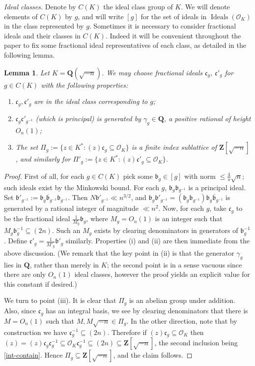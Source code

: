 \documentclass[11pt,reqno]{amsart}
\numberwithin{equation}{section}
\newtheorem{lemma}[theorem]{Lemma}
\theoremstyle{definition}
\theoremstyle{remark}
\newcommand{\mf}{\mathfrak}
\renewcommand{\le}{\leqslant}
\newcommand\Z{\mathbf{Z}}
\newcommand\Q{\mathbf{Q}}
\newcommand\Ideals{\operatorname{Ideals}}
\renewcommand\O{\mathcal{O}}
\begin{document}
\emph{Ideal classes.} Denote by $C(K)$ the ideal class group of $K$. We will denote elements of $C(K)$ by $g$, and will write $[g]$ for the set of ideals in $\Ideals(\O_K)$ in the class represented by $g$. Sometimes it is necessary to consider fractional ideals and their classes in $C(K)$. Indeed it will be convenient throughout the paper to fix some fractional ideal representatives of each class, as detailed in the following lemma. 
\begin{lemma}\label{lem:ideal-reps}
Let $K = \Q(\sqrt{-n})$. We may choose fractional ideals $\mf{c}_g$, $\mf{c}'_g$ for $g \in C(K)$ with the following properties:
\begin{enumerate}
\item[\textup{(i)}]$\mf{c}_g, \mf{c}'_g$ are in the ideal class corresponding to $g$;
\item[\textup{(ii)}]$\mf{c}_g \mf{c}'_{g^{-1}}$ \textup{(}which is principal\textup{)} is generated by $\gamma_g \in \Q$, a positive rational of height $O_n(1)$;
\item[\textup{(iii)}] The set $\Pi_g := \{ z \in K^* : (z) \mf{c}_g \subseteq\O_K\}$ is a finite index sublattice of $\Z[\sqrt{-n}]$, and similarly for $\Pi'_g := \{ z \in K^* : (z) \mf{c}'_g \subseteq\O_K\}$.
\end{enumerate}
\end{lemma}
\begin{proof}
First of all, for each $g \in C(K)$ pick some $\mf{b}_g \in [g]$ with norm $\le \frac{4}{\pi}\sqrt{n}$; such ideals exist by the Minkowski bound. For each $g$, $\mf{b}_g \mf{b}_{g^{-1}}$ is a principal ideal. Set $\mf{b}'_{g^{-1}} := \overline{\mf{b}_g \mf{b}_{g^{-1}}} \mf{b}_{g^{-1}}$. Then $N\mf{b}'_{g^{-1}} \ll n^{3/2}$, and $\mf{b}_g \mf{b}'_{g^{-1}} = (\mf{b}_g \mf{b}_{g^{-1}})\overline{\mf{b}_g \mf{b}_{g^{-1}}}$ is generated by a rational integer of magnitude $\ll n^2$. Now, for each $g$, take $\mf{c}_g$ to be the fractional ideal $\frac{1}{M_g} \mf{b}_g$, where $M_g = O_n(1)$ is an integer such that $M_g\mf{b}_g^{-1} \subseteq (2n)$. Such an $M_g$ exists by clearing denominators in generators of $\mf{b}^{-1}_g$. Define $\mf{c}'_g = \frac{1}{M'_g}\mf{b}'_g$ similarly. Properties (i) and (ii) are then immediate from the above discussion. (We remark that the key point in (ii) is that the generator $\gamma_g$ lies in $\Q$, rather than merely in $K$; the second point is in a sense vacuous since there are only $O_n(1)$ ideal classes, however the proof yields an explicit value for this constant if desired.)

We turn to point (iii). It is clear that $\Pi_g$ is an abelian group under addition. Also, since $\mf{c}_g$ has an integral basis, we see by clearing denominators that there is $M = O_n(1)$ such that $M, M\sqrt{-n} \in \Pi_g$.
In the other direction, note that by construction we have $\mf{c}_g^{-1} \subseteq (2n)$. Therefore if $(z) \mf{c}_g \subseteq \O_K$ then $(z) = (z) \mf{c}_g \mf{c}_g^{-1} \subseteq \O_K \mf{c}_g^{-1} \subseteq (2n) \subseteq \Z[\sqrt{-n}]$, the second inclusion being \cref{int-contain}. Hence $\Pi_g \subseteq \Z[\sqrt{-n}]$, and the claim follows.
\end{proof}
\end{document}
